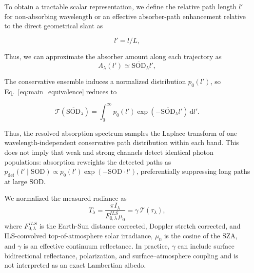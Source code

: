 To obtain a tractable scalar representation, we define the relative path length $l'$ for non-absorbing wavelength or an effective absorber-path enhancement relative to the direct geometrical slant as 

\begin{equation}
  l'
  = l/L,
  \label{eq:main_relative_path_length}
\end{equation}

Thus, we can approximate the absorber amount along each trajectory as
\begin{equation}
  A_\lambda(l')
  \simeq \mathrm{\overline{SOD}}_\lambda l',
  \label{eq:main_scalar_path}
\end{equation}

The conservative ensemble induces a normalized distribution $p_0(l')$, so Eq.~\eqref{eq:main_equivalence} reduces to

\begin{equation}
  \mathcal T(\mathrm{\overline{SOD}}_\lambda)
  = \int_0^\infty p_0(l')
      \exp(-\mathrm{\overline{SOD}}_\lambda l')\,\mathrm{d}l'.
  \label{eq:main_laplace}
\end{equation}

Thus, the resolved absorption spectrum samples the Laplace transform of one
wavelength-independent conservative path distribution within each band.  This
does not imply that weak and strong channels detect identical photon
populations: absorption reweights the detected paths as
$p_{\mathrm{det}}(l'\mid\mathrm{SOD})\propto
p_0(l')\exp(-\mathrm{SOD}\cdot l')$, preferentially suppressing long paths at large
$\mathrm{SOD}$.

We normalized the measured radiance as
\begin{equation}
  T_\lambda
  = \frac{\pi I_\lambda}{F_{0,\lambda}^{ILS}\mu_0}
  = \gamma\,\mathcal T(\tau_\lambda),
  \label{eq:main_transmittance}
\end{equation}
where $F_{0,\lambda}^{ILS}$ is the Earth-Sun distance corrected, Doppler stretch corrected, and
ILS-convolved top-of-atmosphere solar irradiance, $\mu_0$ is the
cosine of the SZA, and $\gamma$ is an effective continuum
reflectance.  In practice, $\gamma$ can include surface bidirectional
reflectance, polarization, and surface--atmosphere coupling and is not
interpreted as an exact Lambertian albedo.

